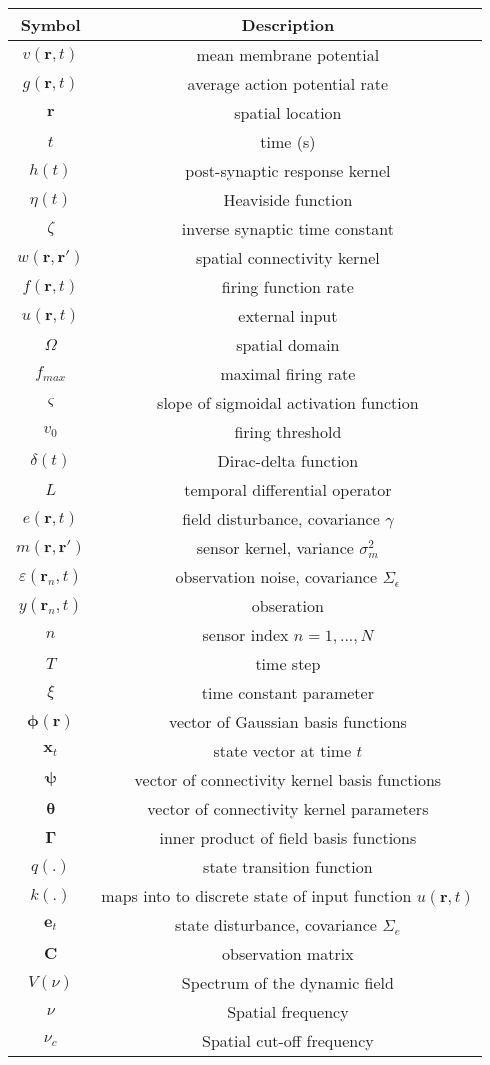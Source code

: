 \documentclass[12pt]{iopart}		%
\begin{document}
\begin{tabular} {c|c} 
	\hline\hline
	Symbol & Description \\ \hline
	$v(\mathbf{r},t)$ & mean membrane potential \\
	$g(\mathbf{r},t)$ & average action potential rate \\
	$\mathbf{r}$ & spatial location \\
	$t$ & time (s) \\
	$h(t)$ & post-synaptic response kernel \\
	$\eta(t)$ & Heaviside function \\
	$\zeta$ & inverse synaptic time constant \\
	$w(\mathbf{r},\mathbf{r}')$ & spatial connectivity kernel \\
	$f(\mathbf{r},t)$ & firing function rate \\
	$u(\mathbf{r},t)$ & external input \\
	$\Omega$ & spatial domain \\
	$f_{max}$ & maximal firing rate \\
	$\varsigma$ & slope of sigmoidal activation function \\
	$v_0$ & firing threshold \\
	$\delta(t)$ & Dirac-delta function \\
	$L$ & temporal differential operator \\
	$e(\mathbf{r},t)$ & field disturbance, covariance $\gamma$\\
	$m(\mathbf{r},\mathbf{r}')$ & sensor kernel, variance $\sigma_m^2$ \\
	$\varepsilon(\mathbf{r}_n,t)$ & observation noise, covariance $\Sigma_\epsilon$ \\
	$y(\mathbf{r}_n,t)$ & obseration \\
	$n$ & sensor index $n=1,...,N$ \\
	$T$ & time step \\
	$\xi$ & time constant parameter \\
	$\boldsymbol{\phi(r)}$ & vector of Gaussian basis functions \\
	$\mathbf{x}_t$ & state vector at time $t$ \\
	$\boldsymbol{\psi}$ & vector of connectivity kernel basis functions \\
	$\boldsymbol{\theta}$ & vector of connectivity kernel parameters \\
	$\boldsymbol{\Gamma}$ & inner product of field basis functions \\
	$q(.)$ & state transition function \\
	$k(.)$ & maps into to discrete state of input function $u(\mathbf{r},t)$ \\
	$\mathbf{e}_t$ & state disturbance, covariance $\Sigma_e$ \\
	$\mathbf{C}$ & observation matrix \\
	$V(\nu)$ & Spectrum of the dynamic field \\ 
	$\nu$ & Spatial frequency \\
	$\nu_c$ & Spatial cut-off frequency \\
\end{tabular}
\end{document}
